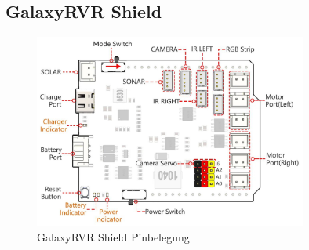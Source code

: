 \documentclass{vorlage-design-main}
\begin{document}
\hypertarget{galaxyrvr-shield}{%
\subsection{GalaxyRVR Shield}\label{galaxyrvr-shield}}

\begin{figure}
\centering
\includegraphics[width=0.8\textwidth]{images/galaxyrvr_shield_pinout.pdf}
\floatnotes{}
\caption{GalaxyRVR Shield Pinbelegung}
\end{figure}
\end{document}
